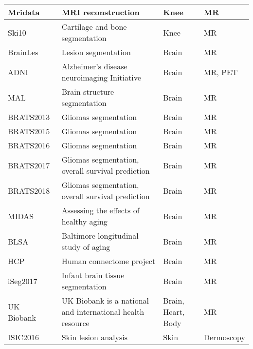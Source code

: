 \begin{longtable}{|>{\arraybackslash}p{5cm}|>{\arraybackslash}p{6cm}|>{\arraybackslash}p{1.7cm}|>{\arraybackslash}p{2.3cm}|}
	Mridata~\cite{mrid} & MRI reconstruction & Knee & MR \\ \hline 
	
	Ski10~\cite{ski10} & Cartilage and bone segmentation & Knee & MR \\ \hline 
	
	BrainLes~\cite{crimi2019brainlesion} & Lesion segmentation & Brain & MR \\ \hline 
	
	ADNI~\cite{adni} & Alzheimer's disease neuroimaging Initiative & Brain & MR, PET \\ \hline 
	
	MAL~\cite{vanderbilt} & Brain structure segmentation & Brain & MR \\ \hline 
	
	BRATS2013~\cite{BRATS2013,menze2014multimodal} & Gliomas segmentation & Brain & MR \\ \hline 
	
	BRATS2015~\cite{BRATS2015} & Gliomas segmentation & Brain & MR \\ \hline 
	
	BRATS2016~\cite{BRATS2016} & Gliomas segmentation & Brain & MR \\ \hline 
	
	BRATS2017~\cite{BRATS2017} & Gliomas segmentation, overall survival prediction & Brain & MR \\ \hline 
	
	BRATS2018~\cite{BRATS2018} & Gliomas segmentation, overall survival prediction & Brain & MR \\ \hline 
	MIDAS~\cite{bullitt2005vessel} & Assessing the effects of healthy aging & Brain & MR \\ \hline 
	
	BLSA~\cite{resnick2003longitudinal} & Baltimore longitudinal study of aging & Brain & MR \\ \hline 
	
	HCP~\cite{van2012human} & Human connectome project & Brain & MR \\ \hline 
	
	iSeg2017~\cite{wang2019benchmark} & Infant brain tissue segmentation & Brain & MR \\ \hline 
	
	UK Biobank~\cite{ukbiobank} & UK Biobank is a national and international health resource & Brain, Heart, Body & MR \\ \hline 
	
	ISIC2016~\cite{gutman2016skin} & Skin lesion analysis &Skin & Dermoscopy \\ \hline 
	

\end{longtable}
